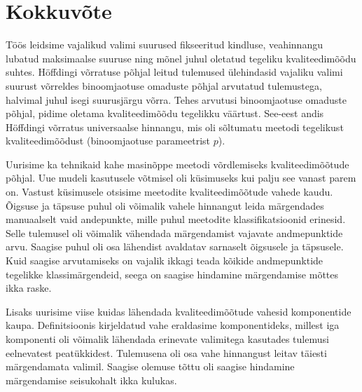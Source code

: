 \section{Kokkuvõte}
Töös leidsime vajalikud valimi suurused fikseeritud kindluse, veahinnangu lubatud maksimaalse suuruse ning mõnel juhul oletatud tegeliku kvaliteedimõõdu suhtes. Höffdingi võrratuse põhjal leitud tulemused ülehindasid vajaliku valimi suurust võrreldes binoomjaotuse omaduste põhjal arvutatud tulemustega, halvimal juhul isegi suurusjärgu võrra. Tehes arvutusi binoomjaotuse omaduste põhjal, pidime oletama kvaliteedimõõdu tegelikku väärtust. See-eest andis Höffdingi võrratus universaalse hinnangu, mis oli sõltumatu meetodi tegelikust kvaliteedimõõdust (binoomjaotuse parameetrist $p$).

Uurisime ka tehnikaid kahe masinõppe meetodi võrdlemiseks kvaliteedimõõtude põhjal. Uue mudeli kasutusele võtmisel oli küsimuseks kui palju see vanast parem on. Vastust küsimusele otsisime meetodite kvaliteedimõõtude vahede kaudu. Õigsuse ja täpsuse puhul oli võimalik vahele hinnangut leida märgendades manuaalselt vaid andepunkte, mille puhul meetodite klassifikatsioonid erinesid. Selle tulemusel oli võimalik vähendada märgendamist vajavate andmepunktide arvu. Saagise puhul oli osa lähendist avaldatav sarnaselt õigsusele ja täpsusele. Kuid saagise arvutamiseks on vajalik ikkagi teada kõikide andmepunktide tegelikke klassimärgendeid, seega on saagise hindamine märgendamise mõttes ikka raske.

Lisaks uurisime viise kuidas lähendada kvaliteedimõõtude vahesid komponentide kaupa. Definitsioonis kirjeldatud vahe eraldasime komponentideks, millest iga komponenti oli võimalik lähendada erinevate valimitega kasutades tulemusi eelnevatest peatükkidest. Tulemusena oli osa vahe hinnangust leitav täiesti märgendamata valimil. Saagise olemuse tõttu oli saagise hindamine märgendamise seisukohalt ikka kulukas.